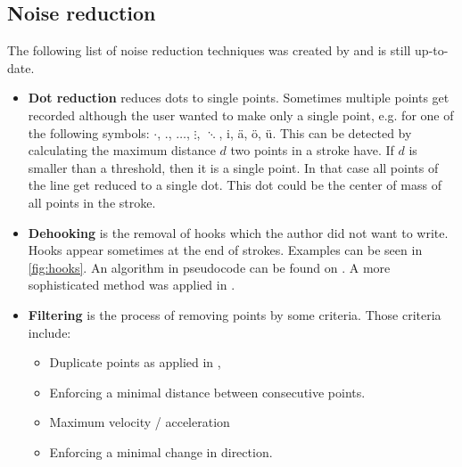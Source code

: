\subsection{Noise reduction}
The following list of noise reduction techniques was created by \cite{Tappert90}
and is still up-to-date.
\begin{itemize}
    \item \textbf{Dot reduction} reduces dots to single points. Sometimes
          multiple points get recorded although the user wanted to make only
          a single point, e.g. for one of the following symbols:
          $\cdot$, ., $\dots$, $\vdots$, $\ddots$, i, ä, ö, ü.
          This can be detected by calculating
          the maximum distance $d$ two points in a stroke have. If $d$ is
          smaller than a threshold, then it is a single point.
          In that case all points of the line get reduced to a single dot.
          This dot could be the center of mass of all points in the stroke.
    \item \textbf{Dehooking} is the removal of hooks which the author did not
          want to write. Hooks appear sometimes at the end of strokes.
          Examples can be seen in \cref{fig:hooks}. An algorithm in pseudocode
          can be found on . A more sophisticated method
          was applied in \cite{Huang09}.
    \item \textbf{Filtering} is the process of removing points by some criteria.
          Those criteria include:
          \begin{itemize}
              \item Duplicate points as applied in \cite{Huang09,Guerfali93},
              \item Enforcing a minimal distance between consecutive 
                    points\cite{Tappert90}.
              \item Maximum velocity / acceleration\cite{Division87}
              \item Enforcing a minimal change in direction\cite{Tappert90}.
          \end{itemize}


\end{itemize}
